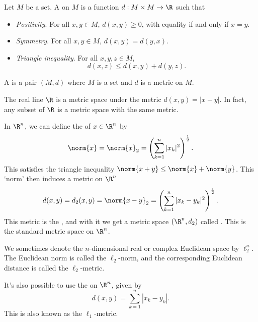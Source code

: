 \begin{definition}[Metric]
    Let $M$ be a set. A  on $M$ is a function $d: M \times M \rightarrow \R$ such that
    \begin{itemize}
        \item \emph{Positivity}. For all $x, y \in M$, $d(x, y) \geq 0$, with equality if and only if $x = y$.
        \item \emph{Symmetry}. For all $x, y \in M$, $d(x, y) = d(y, x)$.
        \item \emph{Triangle inequality}. For all $x, y, z \in M$,
        $$
        d(x, z) \leq d(x, y) + d(y, z).
        $$
    \end{itemize}
\end{definition}

\begin{definition}
    A  is a pair $(M, d)$ where $M$ is a set and $d$ is a metric on $M$. 
\end{definition}

\begin{example}
    The real line $\R$ is a metric space under the metric $d(x, y) = |x - y|$. In fact, any subset of $\R$ is a metric space with the same metric.
\end{example}

\begin{example}
   In $\R^n$, we can define the 
   of $x \in \R^n$ by
   $$
    \norm{x} = \norm{x}_2 = \left(\sum_{k = 1}^n |x_k|^2\right)^{\frac{1}{2}}.
   $$
   This satisfies the triangle inequality $\norm{x + y} \leq \norm{x} + \norm{y}$. This `norm' then induces a metric on $\R^n$
   $$
    d(x, y) = d_2(x, y) = \norm{x - y}_2 = \left(\sum_{k = 1}^n |x_k - y_k|^2\right)^{\frac{1}{2}}.
   $$
   This metric is the , and with it we get a metric space $(\R^n, d_2)$ called . This is the standard metric space on $\R^n$.
\end{example}
\begin{remark}
    We sometimes denote the $n$-dimensional real or complex Euclidean space by $\ell_2^n$. The Euclidean norm is called the $\ell_2$-norm, and the corresponding Euclidean distance is called the $\ell_2$-metric.
\end{remark}

\begin{example}
It's also possible to use the  on $\R^n$, given by
$$
d(x, y) = \sum_{k = 1}^{n} |x_k - y_k|.
$$
This is also known as the $\ell_1$-metric.
\end{example}

